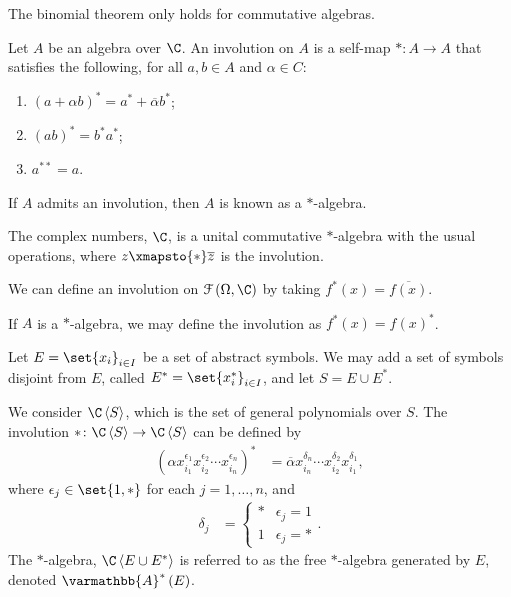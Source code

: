 \documentclass[10pt]{mypackage}
\renewcommand*{\mathbb}[1]{\varmathbb{#1}}
\newcommand{\A}{\mathbb{A}}
\begin{document}
\begin{remark}
  The binomial theorem only holds for commutative algebras.
\end{remark}
\begin{definition}
  Let $A$ be an algebra over $\C$. An involution on $A$ is a self-map $\ast\colon A\rightarrow A$ that satisfies the following, for all $a,b\in A$ and $\alpha \in C$:
  \begin{enumerate}[(1)]
    \item $\left(a + \alpha b\right)^{\ast} = a^{\ast} + \overline{\alpha}b^{\ast}$;
    \item $\left(ab\right)^{\ast} = b^{\ast}a^{\ast}$;
    \item $a^{\ast\ast} = a$.
  \end{enumerate}
  If $A$ admits an involution, then $A$ is known as a $\ast$-algebra.
\end{definition}
\begin{example}
  The complex numbers, $\C$, is a unital commutative $\ast$-algebra with the usual operations, where $z\xmapsto{\ast}\overline{z}$ is the involution.
\end{example}
\begin{example}
  We can define an involution on $\mathcal{F}\left(\Omega,\C\right)$ by taking $f^{\ast}\left(x\right) = \overline{f(x)}$.\newline

  If $A$ is a $\ast$-algebra, we may define the involution as $f^{\ast}\left(x\right) = f\left(x\right)^{\ast}$.
\end{example}
\begin{example}
  Let $E = \set{x_i}_{i\in I}$ be a set of abstract symbols. We may add a set of symbols disjoint from $E$, called $E^{\ast} = \set{x_i^{\ast}}_{i\in I}$, and let $S = E\cup E^{\ast}$.\newline

  We consider $\C \left\langle S \right\rangle$, which is the set of general polynomials over $S$. The involution $\ast\colon \C \left\langle S \right\rangle \rightarrow \C \left\langle S \right\rangle$ can be defined by
  \begin{align*}
    \left(\alpha x_{i_1}^{\epsilon_1}x_{i_2}^{\epsilon_2}\cdots x_{i_n}^{\epsilon_n}\right)^{\ast} &= \overline{\alpha} x_{i_n}^{\delta_n}\cdots x_{i_2}^{\delta_2}x_{i_1}^{\delta_1},
  \end{align*}
  where $\epsilon_j \in \set{1,\ast}$ for each $j=1,\dots,n$, and
  \begin{align*}
    \delta_j &= \begin{cases}
      \ast & \epsilon_j = 1\\
      1 & \epsilon_j = \ast
    \end{cases}.
  \end{align*}
  The $\ast$-algebra, $\C \left\langle E\cup E^{\ast} \right\rangle$ is referred to as the free $\ast$-algebra generated by $E$, denoted $\A^{\ast}\left(E\right)$.
\end{example}
\end{document}
